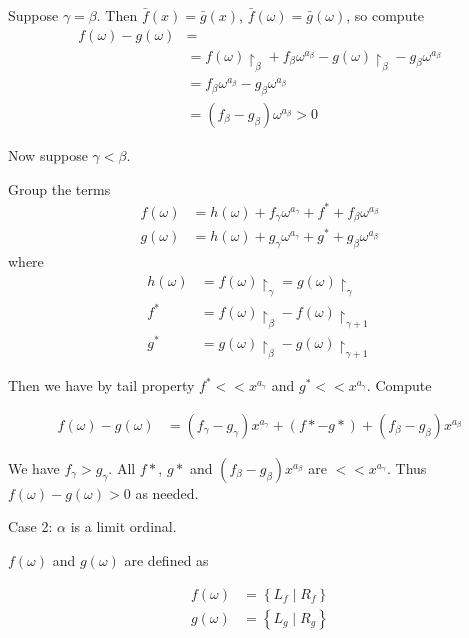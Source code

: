\documentclass{article}
\newcommand{\paren}[1]{\left( #1 \right)}
\newcommand{\curly}[1]{\left\{ #1 \right\}}
\newcommand{\w}{\omega}
\newcommand{\midr}[1]{\restriction_{#1}}
\begin{document}
Suppose $\gamma = \beta$.
Then $\bar f(x) = \bar g(x)$, $\bar f(\w) = \bar g(\w)$, so compute
\begin{align*}
  f(\w) - g(\w) &= \\
	&= f(\w)\midr\beta + f_\beta \w^{a_\beta} - g(\w)\midr\beta - g_\beta \w^{a_\beta} \\
	&= f_\beta \w^{a_\beta} - g_\beta \w^{a_\beta} \\
	&= \paren{f_\beta - g_\beta} \w^{a_\beta} > 0
\end{align*}

Now suppose $\gamma < \beta$.

Group the terms
\begin{align*}
  f(\w) &= h(\w) + f_\gamma \w^{a_\gamma} + f^* + f_\beta \w^{a_\beta} \\
  g(\w) &= h(\w) + g_\gamma \w^{a_\gamma} + g^* + g_\beta \w^{a_\beta}
\end{align*}
where
\begin{align*}
	h(\w) &= f(\w)\midr\gamma = g(\w)\midr\gamma \\
	f^* &= f(\w)\midr\beta - f(\w)\midr{\gamma + 1} \\
	g^* &= g(\w)\midr\beta - g(\w)\midr{\gamma + 1}
\end{align*}

Then we have by tail property $f^* << x^{a_\gamma}$ and $g^* << x^{a_\gamma}$. Compute

\begin{align*}
  f(\w) - g(\w) &= (f_\gamma - g_\gamma) x^{a_\gamma} + (f* - g*) + (f_\beta - g_\beta) x^{a_\beta}
\end{align*}

We have $f_\gamma > g_\gamma$.
All $f*$, $g*$ and $(f_\beta - g_\beta) x^{a_\beta}$ are  $<< x^{a_\gamma}$.
Thus $f(\w) - g(\w) > 0$ as needed.

Case 2: $\alpha$ is a limit ordinal.

$f(\w)$ and $g(\w)$ are defined as 

\begin{align*}
  f(\w) &= \curly{L_f \mid R_f} \\
  g(\w) &= \curly{L_g \mid R_g}
\end{align*}
\end{document}
